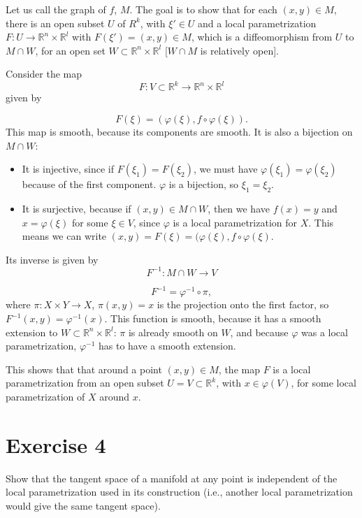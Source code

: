 \documentclass[a4paper,11pt,pdftex]{article}
\begin{document}
Let us call the graph of $f$, $M$. The goal is to show that for each $(x,y)\in M$, there is an open subset $U$ of $R^k$, with $\xi'\in U$ and a local parametrization $F:U\to \mathbb{R}^n\times \mathbb{R}^l$ with $F(\xi') = (x,y)\in M$, which is a diffeomorphism from $U$ to  $M\cap W$, for an open set $W\subset \mathbb{R}^n\times \mathbb{R}^l$ [$W\cap M$ is relatively open].

Consider the map 
$$
F:V\subset \mathbb{R}^k \to \mathbb{R}^n\times \mathbb{R}^l
$$ given by

$$
F(\xi) = (\varphi(\xi), f\circ \varphi (\xi)).
$$
This map is smooth, because its components are smooth. It is also a bijection on  $M\cap W$:
\begin{itemize}
    \item It is injective, since if $F(\xi_1) = F(\xi_2)$, we must have $\varphi(\xi_1)=\varphi(\xi_2)$ because of the first component. $\varphi$ is a bijection, so $\xi_1 = \xi_2$. 
    \item It is surjective, because if $(x,y)\in M\cap W$, then we have $f(x)=y$ and $x=\varphi(\xi)$ for some $\xi \in V$, since $\varphi$ is a local parametrization for $X$. This means we can write $(x,y) = F(\xi) = (\varphi(\xi), f\circ \varphi(\xi)$.
\end{itemize}

Its inverse is given by 
$$
F^{-1} : M\cap W \to V
$$

$$
F^{-1}= \varphi^{-1}\circ \pi,
$$
where $\pi:X\times Y \to X$, $\pi(x,y) = x$ is the projection onto the first factor, so
$F^{-1}(x,y) = \varphi^{-1}(x)$.
This function is smooth, because it has a smooth extension to $W\subset \mathbb{R}^n\times \mathbb{R}^l$: $\pi$ is already smooth on $W$, and because $\varphi$ was a local parametrization, $\varphi^{-1}$ has to have a smooth extension. 

This shows that that around a point $(x,y)\in M$, the map $F$ is a local parametrization from an open subset $U=V\subset \mathbb{R}^k$, with $x\in \varphi(V)$, for some local parametrization of $X$ around $x$. 

\section*{Exercise 4}

Show that the tangent space of a manifold at any point is independent of the local parametrization used in its construction (i.e., another local parametrization would give the same tangent space).
\end{document}
